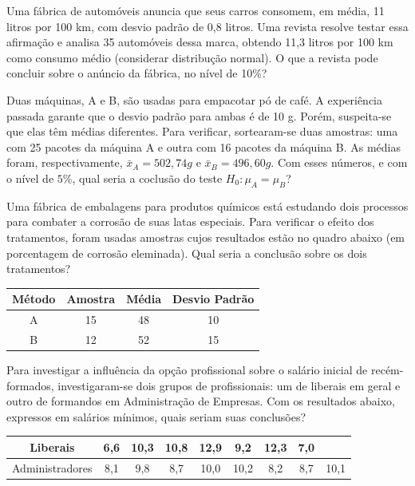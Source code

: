 \documentclass{report}
\begin{document}
\begin{Exercise}
\Question Uma fábrica de automóveis anuncia que seus carros consomem, em média, 11 litros por 100 km, com desvio padrão de 0,8 litros. Uma revista resolve testar essa 
afirmação e analisa 35 automóveis dessa marca, obtendo 11,3 litros por 100 km como consumo médio (considerar distribução normal). O que a revista pode concluir 
sobre o anúncio da fábrica, no nível de 10\%?

\Question Duas máquinas, A e B, são usadas para empacotar pó de café. A experiência passada garante que o desvio padrão para ambas é de 10 g. Porém, suspeita-se 
que elas têm médias diferentes. Para verificar, sortearam-se duas amostras: uma com 25 pacotes da máquina A e outra com 16 pacotes da máquina B. As médias foram, 
respectivamente, $\bar x_A = 502,74g$ e $\bar x_B = 496,60 g$.  Com esses números, e com o nível de $5\%$, qual seria a coclusão do teste $H_0: \mu_A = \mu_B$?

\Question Uma fábrica de embalagens para produtos químicos está estudando dois processos para combater a corrosão de suas latas especiais. Para verificar o efeito dos 
tratamentos, foram usadas amostras cujos resultados estão no quadro abaixo (em porcentagem de corrosão eleminada). Qual seria a conclusão sobre os dois tratamentos?

\begin{tabular}{cccc}\\ \hline
Método & Amostra & Média & Desvio Padrão \\ \hline
A & 15 & 48 & 10 \\
B & 12 & 52 & 15 \\ \hline
\end{tabular}

\Question \item Para investigar a influência da opção profissional sobre o salário inicial de recém-formados, investigaram-se dois grupos de profissionais: um de liberais em geral 
e outro de formandos em Administração de Empresas. Com os resultados abaixo, expressos em salários mínimos, quais seriam suas conclusões?

\begin{tabular}{ccccccccc}\\ \hline
Liberais & 6,6 & 10,3 & 10,8 & 12,9 & 9,2 & 12,3 & 7,0 &  \\ \hline
Administradores & 8,1 & 9,8 & 8,7 & 10,0 & 10,2 & 8,2 & 8,7 & 10,1 \\ \hline
\end{tabular}

\newpage


\end{Exercise}
\end{document}
